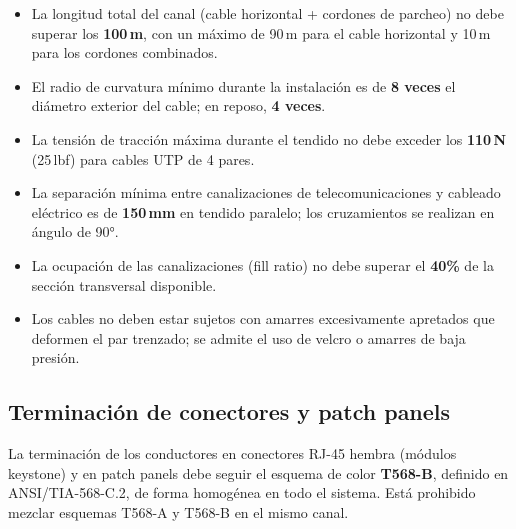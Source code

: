 \begin{itemize}
    \item La longitud total del canal (cable horizontal + cordones de parcheo)
    no debe superar los \textbf{100\,m}, con un máximo de 90\,m para el cable
    horizontal y 10\,m para los cordones combinados.

    \item El radio de curvatura mínimo durante la instalación es de
    \textbf{8 veces} el diámetro exterior del cable; en reposo, \textbf{4 veces}.

    \item La tensión de tracción máxima durante el tendido no debe exceder los
    \textbf{110\,N} (25\,lbf) para cables UTP de 4 pares.

    \item La separación mínima entre canalizaciones de telecomunicaciones y
    cableado eléctrico es de \textbf{150\,mm} en tendido paralelo; los
    cruzamientos se realizan en ángulo de 90°.

    \item La ocupación de las canalizaciones (fill ratio) no debe superar el
    \textbf{40\%} de la sección transversal disponible.

    \item Los cables no deben estar sujetos con amarres excesivamente apretados
    que deformen el par trenzado; se admite el uso de velcro o amarres de baja
    presión.
\end{itemize}

\subsection{Terminación de conectores y patch panels}

La terminación de los conductores en conectores RJ-45 hembra (módulos keystone)
y en patch panels debe seguir el esquema de color \textbf{T568-B}, definido en
\mbox{ANSI/TIA-568-C.2}, de forma homogénea en todo el sistema. Está prohibido
mezclar esquemas T568-A y T568-B en el mismo canal.

